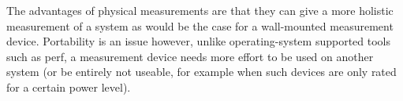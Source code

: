The advantages of physical measurements are that they can give a more holistic measurement of a system as would be the case for a wall-mounted measurement device. 
Portability is an issue however, unlike operating-system supported tools such as perf, a measurement device needs more effort to be used on another system (or be entirely not useable, for example when such devices are only rated for a certain power level).

